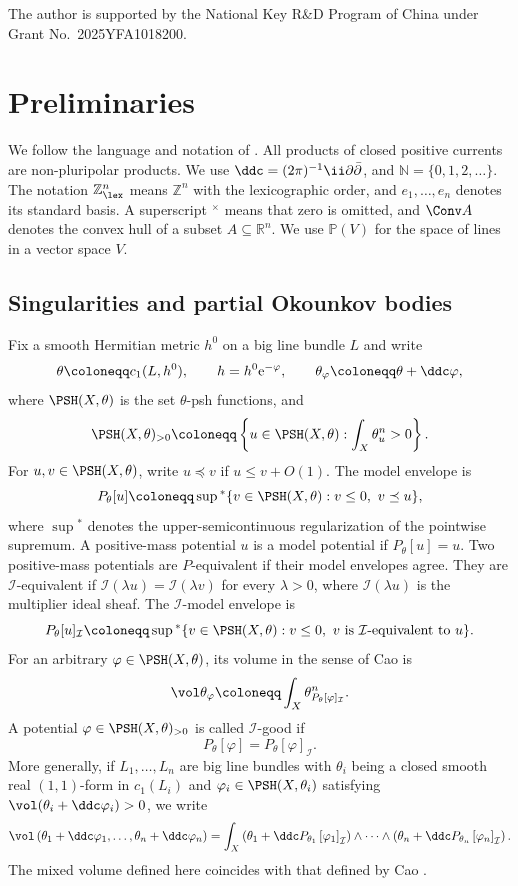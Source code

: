 \documentclass[11pt,a4paper]{amsart}
\begin{document}
The author is supported by the National Key R\&D Program of China under Grant No.~2025YFA1018200.

\section{Preliminaries}\label{sec:preliminaries}

We follow the language and notation of \cite{Xiabook}.  All products of closed positive currents are non-pluripolar products.  We use
$\ddc=(2\pi)^{-1}\ii\partial\bar\partial$, and $\mathbb N=\{0,1,2,\ldots\}$. The notation $\mathbb Z^n_{\lex}$ means $\mathbb Z^n$ with the lexicographic order, and $e_1,\ldots,e_n$ denotes its standard basis. A superscript ${}^\times$ means that zero is omitted, and $\Conv A$ denotes the convex hull of a subset $A\subseteq\mathbb R^n$.  We use $\mathbb P(V)$ for the space of lines in a vector space $V$.

\subsection{Singularities and partial Okounkov bodies}

Fix a smooth Hermitian metric $h^0$ on a big line bundle $L$ and write
\[
 \theta\coloneqq c_1(L,h^0),\qquad h=h^0\mathrm e^{-\varphi},\qquad \theta_\varphi\coloneqq \theta+\ddc\varphi,
\]
where $\PSH(X,\theta)$ is the set $\theta$-psh functions, and
\[
 \PSH(X,\theta)_{>0} \coloneqq \left\{u\in\PSH(X,\theta):\int_X\theta_u^n>0\right\}.
\]
For $u,v\in\PSH(X,\theta)$, write $u\preceq v$ if
$u\leq v+O(1)$.  The model envelope is
\[
 P_\theta[u]
 \coloneqq \sup{}^*\{v\in\PSH(X,\theta):v\leq0,\ v\preceq u\},
\]
where $\sup{}^*$ denotes the upper-semicontinuous regularization of the pointwise supremum.  A positive-mass potential $u$ is a model potential if $P_\theta[u]=u$.  Two positive-mass potentials are $P$-equivalent if their model envelopes agree.  They are $\mathcal{I}$-equivalent if $\mathcal{I}(\lambda u)=\mathcal{I}(\lambda v)$ for every $\lambda>0$, where $\mathcal{I}(\lambda u)$ is the multiplier ideal sheaf. The $\mathcal{I}$-model envelope is
\[
 P_\theta[u]_{\mathcal{I}} \coloneqq \sup{}^*\{v\in\PSH(X,\theta):v\leq 0,\ v\text{ is }\mathcal{I}\text{-equivalent to }u\}.
\]
For an arbitrary $\varphi\in\PSH(X,\theta)$, its volume in the sense of Cao is
\[
    \vol \theta_{\varphi} \coloneqq \int_X\theta_{P_\theta[\varphi]_{\mathcal{I}}}^n.
\]
A potential $\varphi\in \PSH(X,\theta)_{>0}$ is called $\mathcal{I}$-good if
\[
 P_\theta[\varphi]=P_\theta[\varphi]_{\mathcal{I}}.
\]
More generally, if $L_1,\ldots,L_n$ are big line bundles with $\theta_i$ being a closed smooth real $(1,1)$-form in $c_1(L_i)$ and $\varphi_i\in \PSH(X,\theta_i)$ satisfying $\vol(\theta_i+\ddc\varphi_i)>0$, we write
\[
\vol\left( \theta_1+\ddc \varphi_1,\ldots, \theta_n+\ddc \varphi_n\right)=\int_X \left(\theta_1+\ddc P_{\theta_1}\left[\varphi_1\right]_{\mathcal{I}}\right)\wedge \cdots \wedge \left(\theta_n+\ddc P_{\theta_n}\left[\varphi_n\right]_{\mathcal{I}}\right).
\]
The mixed volume defined here coincides with that defined by Cao
\cite[Definition~3.2, Proposition~3.3, and Theorem~3.5]{Xiabdiv}.
\end{document}
